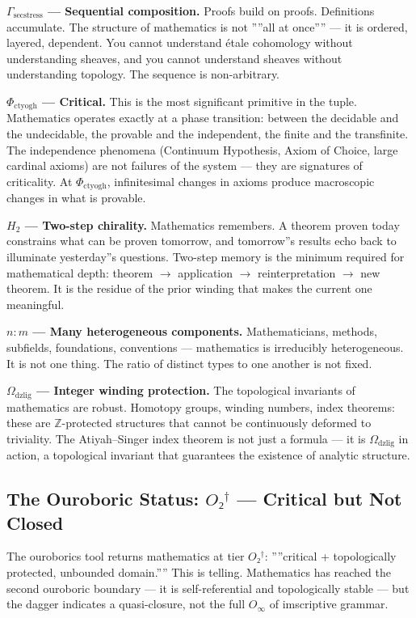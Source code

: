 \documentclass[12pt,a4paper]{article}
\begin{document}
\textbf{$\Gamma_{\text{secstress}}$ --- Sequential composition.} Proofs build on proofs. Definitions accumulate. The structure of mathematics is not ''''all at once'''' --- it is ordered, layered, dependent. You cannot understand étale cohomology without understanding sheaves, and you cannot understand sheaves without understanding topology. The sequence is non-arbitrary.

\textbf{$\Phi_{\text{ctyogh}}$ --- Critical.} This is the most significant primitive in the tuple. Mathematics operates exactly at a phase transition: between the decidable and the undecidable, the provable and the independent, the finite and the transfinite. The independence phenomena (Continuum Hypothesis, Axiom of Choice, large cardinal axioms) are not failures of the system --- they are signatures of criticality. At $\Phi_{\text{ctyogh}}$, infinitesimal changes in axioms produce macroscopic changes in what is provable.

\textbf{$H_2$ --- Two-step chirality.} Mathematics remembers. A theorem proven today constrains what can be proven tomorrow, and tomorrow''s results echo back to illuminate yesterday''s questions. Two-step memory is the minimum required for mathematical depth: theorem $\rightarrow$ application $\rightarrow$ reinterpretation $\rightarrow$ new theorem. It is the residue of the prior winding that makes the current one meaningful.

\textbf{$n{:}m$ --- Many heterogeneous components.} Mathematicians, methods, subfields, foundations, conventions --- mathematics is irreducibly heterogeneous. It is not one thing. The ratio of distinct types to one another is not fixed.

\textbf{$\Omega_{\text{dzlig}}$ --- Integer winding protection.} The topological invariants of mathematics are robust. Homotopy groups, winding numbers, index theorems: these are $\mathbb{Z}$-protected structures that cannot be continuously deformed to triviality. The Atiyah--Singer index theorem is not just a formula --- it is $\Omega_{\text{dzlig}}$ in action, a topological invariant that guarantees the existence of analytic structure.

\subsection{The Ouroboric Status: $O₂^\dagger$ --- Critical but Not Closed}

The ouroborics tool returns mathematics at tier $O₂^\dagger$: ''''critical + topologically protected, unbounded domain.'''' This is telling. Mathematics has reached the second ouroboric boundary --- it is self-referential and topologically stable --- but the dagger indicates a quasi-closure, not the full $O_{\infty}$ of imscriptive grammar.
\end{document}
